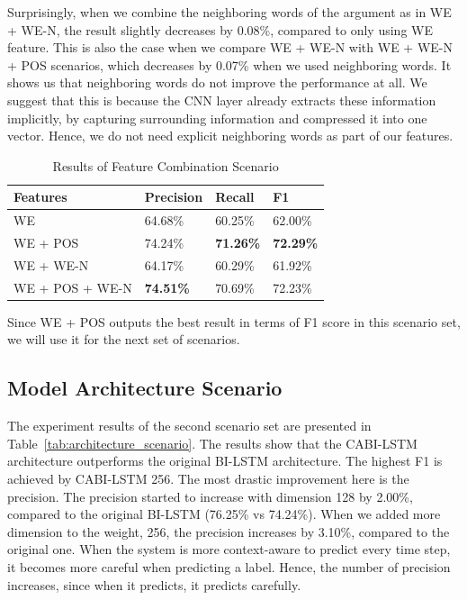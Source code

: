 Surprisingly, when we combine the neighboring words of the argument as in WE + WE-N, the result slightly decreases by 0.08\%, compared to only using WE feature. This is also the case when we compare WE + WE-N with WE + WE-N + POS scenarios, which decreases by 0.07\% when we used neighboring words. It shows us that neighboring words do not improve the performance at all. We suggest that this is because the CNN layer already extracts these information implicitly, by capturing surrounding information and compressed it into one vector. Hence, we do not need explicit neighboring words as part of our features. 

\begin{table}
	\caption{Results of Feature Combination Scenario}
	\label{tab:feature_scenario}
	\begin{tabular}{llll}
		\toprule
		Features		&Precision	&Recall		&F1			\\
		\midrule
		WE				&	64.68\%				&	60.25\%				&	62.00\%	\\
		WE + POS		&	74.24\%				&	\textbf{71.26\%}	&	\textbf{72.29\%}	\\
		WE + WE-N		&	64.17\%				&	60.29\%				&	61.92\%	\\
		WE + POS + WE-N	&	\textbf{74.51\%}	&	70.69\%				&	72.23\%	\\
		\bottomrule
	\end{tabular}
\end{table}

Since WE + POS outputs the best result in terms of F1 score in this scenario set, we will use it for the next set of scenarios.

\subsection{Model Architecture Scenario}
The experiment results of the second scenario set are presented in Table~\ref{tab:architecture_scenario}. The results show that the CABI-LSTM architecture outperforms the original BI-LSTM architecture. The highest F1 is achieved by CABI-LSTM 256. The most drastic improvement here is the precision. The precision started to increase with dimension 128 by 2.00\%, compared to the original BI-LSTM (76.25\% vs 74.24\%). When we added more dimension to the weight, 256, the precision increases by 3.10\%, compared to the original one. When the system is more context-aware to predict every time step, it becomes more careful when predicting a label. Hence, the number of precision increases, since when it predicts, it predicts carefully. 

